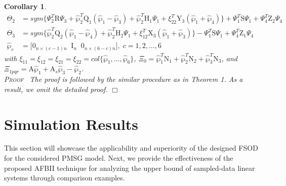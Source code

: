 \documentclass[preprint,11pt]{elsarticle}
\newtheorem{Cor}{Corollary}
\newenvironment{proof}{\noindent \textsc{Proof}\ }{\mbox{}\hfill $\Box$\\}
\begin{document}
\begin{Cor}
\begin{align*}
\Theta_2&=sym\big\{ \Psi_2^T\mathrm{R}\Psi_3+\hat{\wp}_2^T\mathrm{Q}_1(\hat{\wp}_1-\hat{\wp}_3)+\hat{\wp}_2^T\mathrm{H}_1\Psi_1
+\xi_{22}^T\mathrm{Y}_3(\hat{\wp}_1+\hat{\wp}_4) \big\}+\Psi_1^T\mathrm{S}\Psi_1+\Psi_4^T\mathrm{Z}_2\Psi_4\\
\Theta_3&=sym\big\{ \hat{\wp}_2^T\mathrm{Q}_2(\hat{\wp}_1-\hat{\wp}_4)+\hat{\wp}_2^T\mathrm{H}_2\Psi_1
+\xi_{12}^T \mathrm{X}_3(\hat{\wp}_1+\hat{\wp}_3) \big\}-\Psi_1^T\mathrm{S}\Psi_1+\Psi_4^T\mathrm{Z}_1\Psi_4\\
\hat{\wp}_c&=\big[0_{n\times(c-1)n}\;\; \mathrm{I}_{n}\;\;0_{n\times(6-c)n}  \big],\;c=1,2,...,6
\end{align*}
with $\xi_{11}=\xi_{12}=\xi_{21}=\xi_{22}=col\{\hat{\wp}_1,...,\hat{\wp}_6\}$, $\Xi_0=\hat{\wp}^T_1\mathrm{N}_1+\hat{\wp}^T_2\mathrm{N}_2+\hat{\wp}^T_3\mathrm{N}_3$, and
$\Xi_{1pqr}=\mathrm{A}\hat{\wp}_1+\mathrm{A}_{s}\hat{\wp}_3-\hat{\wp}_2$.\\

\begin{proof}
The proof is followed by the similar procedure as in Theorem 1. As a result, we omit the detailed proof.
\end{proof}
\end{Cor}
\vspace{-1cm}
\section{{Simulation Results}}
This section will showcase the applicability and superiority of the designed FSOD for the considered PMSG model. Next, we provide the effectiveness of the proposed AFBII technique for analyzing the upper bound of sampled-data linear systems through comparison examples.
\end{document}
